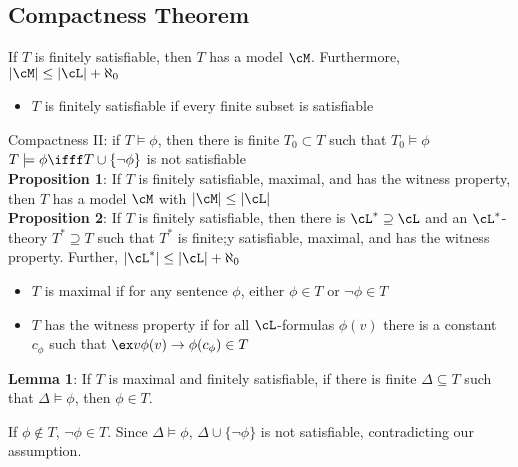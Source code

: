 
\subsection{Compactness Theorem}

\begin{theorem}[Compactness]
    If $T$ is finitely satisfiable, then $T$ has a model $\cM$. Furthermore, $|\cM| \le |\cL| + \aleph_0$ 
\end{theorem}

\begin{itemize}
    \item $T$ is finitely satisfiable if every finite subset is satisfiable
\end{itemize}

\noindent
Compactness II: if $T \models \phi$, then there is finite $T_0 \subset T$ such that $T_0 \models \phi$ \\
$T \models \phi \ifff T \cup \{\neg \phi\}$ is not satisfiable \\

\noindent 
\textbf{Proposition 1}: If $T$ is finitely satisfiable, maximal, and has the witness property, then $T$ has a model $\cM$ with $|\cM| \le |\cL|$ \\

\noindent
\textbf{Proposition 2}: If $T$ is finitely satisfiable, then there is $\cL^* \supseteq \cL$ and an $\cL^*$-theory $T^* \supseteq T$ such that $T^*$ is finite;y satisfiable, maximal, and has the witness property. Further, $|\cL^*| \le |\cL| + \aleph_0$ 

\begin{definition}
    \begin{itemize}
        \item $T$ is maximal if for any sentence $\phi$, either $\phi \in T$ or $\neg \phi \in T$
        \item $T$ has the witness property if for all $\cL$-formulas $\phi(v)$ there is a constant $c_{\phi}$ such that  $\ex v \phi(v) \to \phi(c_{\phi}) \in T$ 
    \end{itemize}
\end{definition}

\noindent
\textbf{Lemma 1}: If $T$ is maximal and finitely satisfiable, if there is finite $\Delta \subseteq T$ such that $\Delta \models \phi$, then $\phi \in T$. 
\begin{pf}
    If $\phi \not\in T$, $\neg \phi \in T$. Since $\Delta \models \phi$, $\Delta \cup \{\neg\phi\}$ is not satisfiable, contradicting our assumption. 
\end{pf}

